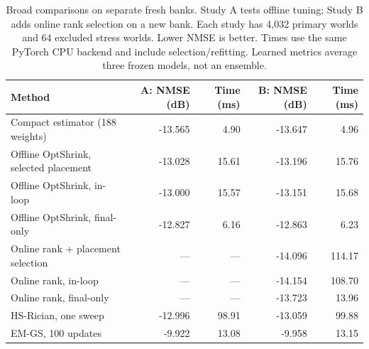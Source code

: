 \begin{table}[!t]
\caption{Broad comparisons on separate fresh banks. Study A tests offline tuning; Study B adds online rank selection on a new bank. Each study has 4,032 primary worlds and 64 excluded stress worlds. Lower NMSE is better. Times use the same PyTorch CPU backend and include selection/refitting. Learned metrics average three frozen models, not an ensemble.}
\label{tab:broad}\centering\footnotesize
\setlength{\tabcolsep}{4pt}
\begin{tabular}{@{}lrrrr@{}}\toprule
Method & A: NMSE (dB) & Time (ms) & B: NMSE (dB) & Time (ms)\\
\midrule
Compact estimator (188 weights) & -13.565 & 4.90 & -13.647 & 4.96\\
Offline OptShrink, selected placement & -13.028 & 15.61 & -13.196 & 15.76\\
Offline OptShrink, in-loop & -13.000 & 15.57 & -13.151 & 15.68\\
Offline OptShrink, final-only & -12.827 & 6.16 & -12.863 & 6.23\\
Online rank + placement selection & --- & --- & -14.096 & 114.17\\
Online rank, in-loop & --- & --- & -14.154 & 108.70\\
Online rank, final-only & --- & --- & -13.723 & 13.96\\
HS-Rician, one sweep & -12.996 & 98.91 & -13.059 & 99.88\\
EM-GS, 100 updates & -9.922 & 13.08 & -9.958 & 13.15\\
\bottomrule
\end{tabular}
\end{table}
